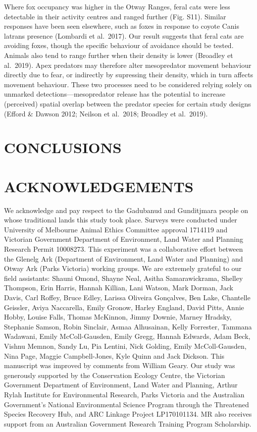 \documentclass[]{elsarticle} %
\begin{document}
Where fox occupancy was higher in the Otway Ranges, feral cats were less detectable in their activity centres and ranged further (Fig. S11). Similar responses have been seen elsewhere, such as foxes in response to coyote Canis latrans presence (Lombardi et al.~2017). Our result suggests that feral cats are avoiding foxes, though the specific behaviour of avoidance should be tested. Animals also tend to range further when their density is lower (Broadley et al.~2019). Apex predators may therefore alter mesopredator movement behaviour directly due to fear, or indirectly by supressing their density, which in turn affects movement behaviour. These two processes need to be considered relying solely on unmarked detections---mesopredator release has the potential to increase (perceived) spatial overlap between the predator species for certain study designs (Efford \& Dawson 2012; Neilson et al.~2018; Broadley et al.~2019).

\newpage

\hypertarget{conclusions}{%
\section{CONCLUSIONS}\label{conclusions}}

\newpage

\hypertarget{acknowledgements}{%
\section{ACKNOWLEDGEMENTS}\label{acknowledgements}}

We acknowledge and pay respect to the Gadubanud and Gunditjmara people on whose traditional lands this study took place. Surveys were conducted under University of Melbourne Animal Ethics Committee approval 1714119 and Victorian Government Department of Environment, Land Water and Planning Research Permit 10008273. This experiment was a collaborative effort between the Glenelg Ark (Department of Environment, Land Water and Planning) and Otway Ark (Parks Victoria) working groups.
We are extremely grateful to our field assistants: Shauni Omond, Shayne Neal, Asitha Samarawickrama, Shelley Thompson, Erin Harris, Hannah Killian, Lani Watson, Mark Dorman, Jack Davis, Carl Roffey, Bruce Edley, Larissa Oliveira Gonçalves, Ben Lake, Chantelle Geissler, Aviya Naccarella, Emily Gronow, Harley England, David Pitts, Annie Hobby, Louise Falls, Thomas McKinnon, Jimmy Downie, Marney Hradsky, Stephanie Samson, Robin Sinclair, Asmaa Alhusainan, Kelly Forrester, Tammana Wadawani, Emily McColl-Gausden, Emily Gregg, Hannah Edwards, Adam Beck, Vishnu Memnon, Sandy Lu, Pia Lentini, Nick Golding, Emily McColl-Gausden, Nina Page, Maggie Campbell-Jones, Kyle Quinn and Jack Dickson. This manuscript was improved by comments from William Geary. Our study was generously supported by the Conservation Ecology Centre, the Victorian Government Department of Environment, Land Water and Planning, Arthur Rylah Institute for Environmental Research, Parks Victoria and the Australian Government's National Environmental Science Program through the Threatened Species Recovery Hub, and ARC Linkage Project LP170101134. MR also receives support from an Australian Government Research Training Program Scholarship.
\end{document}
